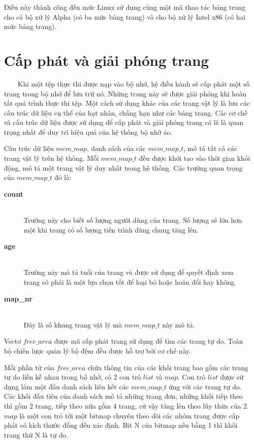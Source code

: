 \documentclass{article}
\begin{document}
Điều này thành công đến mức Linux sử dụng cùng một mã thao tác bảng trang cho cả bộ xử lý Alpha (có ba mức bảng trang) và cho bộ xử lý Intel x86 (có hai mức bảng trang).

\section{Cấp phát và giải phóng trang}

~~~~Khi một tệp thực thi được nạp vào bộ nhớ, hệ điều hành sẽ cấp phát một số trang trong bộ nhớ để lưu trữ nó. Những trang này sẽ được giải phóng khi hoàn tất quá trình thực thi tệp. Một cách sử dụng khác của các trang vật lý là lưu các cấu trúc dữ liệu cụ thể của hạt nhân, chẳng hạn như các bảng trang. Các cơ chế và cấu trúc dữ liệu được sử dụng để cấp phát và giải phóng trang có lẽ là quan trọng nhất để duy trì hiệu quả của hệ thống bộ nhớ ảo.\vspace{1em}

Cấu trúc dữ liệu $mem\_map$, danh sách của các $mem\_map\_t$, mô tả tất cả các trang vật lý trên hệ thống. Mỗi $mem\_map\_t$ đều được khởi tạo vào thời gian khỏi động, mô tả một trang vật lý duy nhất trong hệ thống. Các trường quan trọng của $mem\_map\_t$ đó là:

\begin{description}
  \item[\textbf{count}]\hfill \\ Trường này cho biết số lượng người dùng của trang. Số lượng sẽ lớn hơn một khi trang có số lượng tiến trình dùng chung tăng lên.
  \item[\textbf{age}]\hfill \\ Trường này mô tả tuổi của trang và được sử dụng để quyết định xem trang có phải là một lựa chọn tốt để loại bỏ hoặc hoán đổi hay không.
  \item[\textbf{map\_nr}]\hfill \\ Đây là số khung trang vật lý mà $mem\_map\_t$ này mô tả.
\end{description}

Vectơ $free\_area$ được mã cấp phát trang sử dụng để tìm các trang tự do. Toàn bộ chiến lược quản lý bộ đệm đều được hỗ trợ bởi cơ chế này.\vspace{1em}

Mỗi phần tử của $free\_area$ chứa thông tin của các khối trang bao gồm các trang tự do liền kề nhau trong bộ nhớ, có 2 con trỏ $list$ và $map$. Con trỏ $list$ được sử dụng làm một đầu danh sách liên kết các $mem\_map\_t$ ứng với các trang tự do. Các khối đầu tiên của danh sách mô tả những trang đơn, những khối tiếp theo thì gồm 2 trang, tiếp theo nữa gồm 4 trang, cứ vậy tăng lên theo lũy thừa của 2. $map$ là một con trỏ tới một bitmap chuyên theo dõi các nhóm trang được cấp phát có kích thước đồng đều xác định. Bit N của bitmap nếu bằng 1 thì khối trang thứ N là tự do.
\end{document}
